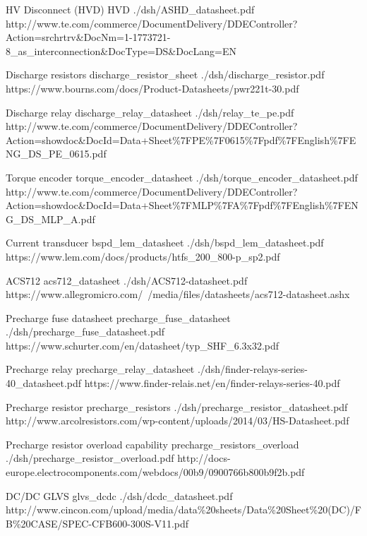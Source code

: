 

	{HV Disconnect (HVD)}
	{HVD}
	{./dsh/ASHD_datasheet.pdf}
	{http://www.te.com/commerce/DocumentDelivery/DDEController?Action=srchrtrv\&DocNm=1-1773721-8_as_interconnection\&DocType=DS\&DocLang=EN}

	{Discharge resistors}
	{discharge_resistor_sheet}
	{./dsh/discharge_resistor.pdf}
	{https://www.bourns.com/docs/Product-Datasheets/pwr221t-30.pdf}

	{Discharge relay}
	{discharge_relay_datasheet}
	{./dsh/relay_te_pe.pdf}
	{http://www.te.com/commerce/DocumentDelivery/DDEController?Action=showdoc\&DocId=Data+Sheet\%7FPE\%7F0615\%7Fpdf\%7FEnglish\%7FENG_DS_PE_0615.pdf}


	{Torque encoder}
	{torque_encoder_datasheet}
	{./dsh/torque_encoder_datasheet.pdf}
	{http://www.te.com/commerce/DocumentDelivery/DDEController?Action=showdoc\&DocId=Data+Sheet\%7FMLP\%7FA\%7Fpdf\%7FEnglish\%7FENG_DS_MLP_A.pdf}

	{Current transducer}
	{bspd_lem_datasheet}
	{./dsh/bspd_lem_datasheet.pdf}
	{https://www.lem.com/docs/products/htfs_200_800-p_sp2.pdf}

	{ACS712}
	{acs712_datasheet}
	{./dsh/ACS712-datasheet.pdf}
	{https://www.allegromicro.com/~/media/files/datasheets/acs712-datasheet.ashx}

	{Precharge fuse datasheet}
	{precharge_fuse_datasheet}
	{./dsh/precharge_fuse_datasheet.pdf}
	{https://www.schurter.com/en/datasheet/typ_SHF_6.3x32.pdf}

	{Precharge relay}
	{precharge_relay_datasheet}
	{./dsh/finder-relays-series-40_datasheet.pdf}
	{https://www.finder-relais.net/en/finder-relays-series-40.pdf}

	{Precharge resistor}
	{precharge_resistors}
	{./dsh/precharge_resistor_datasheet.pdf}
	{http://www.arcolresistors.com/wp-content/uploads/2014/03/HS-Datasheet.pdf}

	{Precharge resistor overload capability}
	{precharge_resistors_overload}
	{./dsh/precharge_resistor_overload.pdf}
	{http://docs-europe.electrocomponents.com/webdocs/00b9/0900766b800b9f2b.pdf}

	{DC/DC GLVS}
	{glvs_dcdc}
	{./dsh/dcdc_datasheet.pdf}
	{http://www.cincon.com/upload/media/data\%20sheets/Data\%20Sheet\%20(DC)/FB\%20CASE/SPEC-CFB600-300S-V11.pdf}

